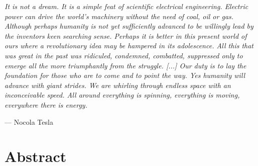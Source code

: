 
\epigraph{\textit{It is not a dream. It is a simple feat of scientific electrical engineering. Electric power can drive the world's machinery without the need of coal, oil or gas. Although perhaps humanity is not yet sufficiently advanced to be willingly lead by the inventors keen searching sense. Perhaps it is better in this present world of ours where a revolutionary idea may be hampered in its adolescence. All this that was great in the past was ridiculed, condemned, combatted, suppressed only to emerge all the more triumphantly from the struggle. [...] Our duty is to lay the foundation for those who are to come and to point the way. Yes humanity will advance with giant strides. We are whirling through endless space with an inconceivable speed. All around everything is spinning, everything is moving, everywhere there is energy.}}{--- Nocola Tesla}


\chapter*{Abstract}




